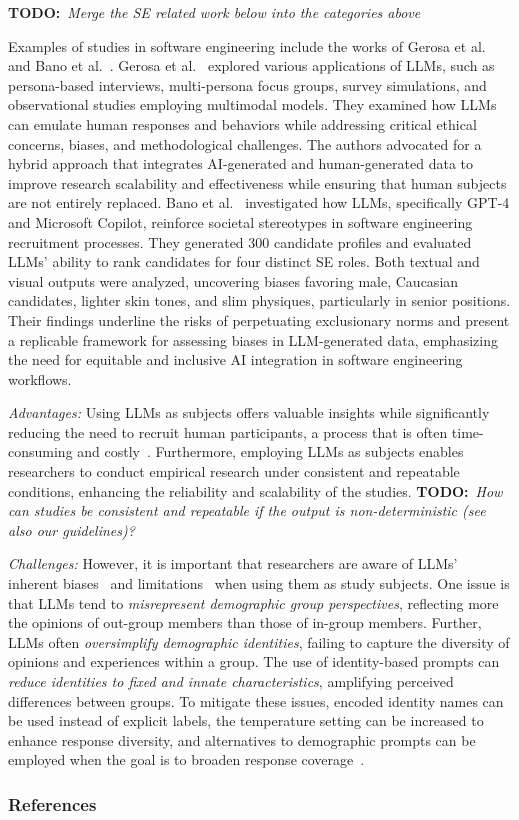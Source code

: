 \documentclass[11pt]{article}
\newcommand{\todo}[1]{{\textbf{TODO:}\ \textit{#1}}} %
\begin{document}
\todo{Merge the SE related work below into the categories above}

Examples of studies in software engineering include the works of Gerosa et al.~\cite{DBLP:journals/ase/GerosaTSS24} and Bano et al.~\cite{bano2025doessoftwareengineerlook}. 
Gerosa et al.~\cite{DBLP:journals/ase/GerosaTSS24} explored various applications of LLMs, such as persona-based interviews, multi-persona focus groups, survey simulations, and observational studies employing multimodal models. They examined how LLMs can emulate human responses and behaviors while addressing critical ethical concerns, biases, and methodological challenges. The authors advocated for a hybrid approach that integrates AI-generated and human-generated data to improve research scalability and effectiveness while ensuring that human subjects are not entirely replaced.
Bano et al.~\cite{bano2025doessoftwareengineerlook} investigated how LLMs, specifically GPT-4 and Microsoft Copilot, reinforce societal stereotypes in software engineering recruitment processes. They generated 300 candidate profiles and evaluated LLMs' ability to rank candidates for four distinct SE roles. Both textual and visual outputs were analyzed, uncovering biases favoring male, Caucasian candidates, lighter skin tones, and slim physiques, particularly in senior positions. Their findings underline the risks of perpetuating exclusionary norms and present a replicable framework for assessing biases in LLM-generated data, emphasizing the need for equitable and inclusive AI integration in software engineering workflows.

\emph{Advantages:} Using LLMs as subjects offers valuable insights while significantly reducing the need to recruit human participants, a process that is often time-consuming and costly~\cite{DBLP:conf/vl/Madampe0HO24}. 
Furthermore, employing LLMs as subjects enables researchers to conduct empirical research under consistent and repeatable conditions, enhancing the reliability and scalability of the studies.
\todo{How can studies be consistent and repeatable if the output is non-deterministic (see also our guidelines)?}

\emph{Challenges:} However, it is important that researchers are aware of LLMs' inherent biases~\cite{Crowell2023} and limitations~\cite{DBLP:journals/ais/HardingDLL24, DBLP:journals/corr/abs-2402-01908} when using them as study subjects.
One issue is that LLMs tend to \emph{misrepresent demographic group perspectives}, reflecting more the opinions of out-group members than those of in-group members.
Further, LLMs often \emph{oversimplify demographic identities}, failing to capture the diversity of opinions and experiences within a group.
The use of identity-based prompts can \emph{reduce identities to fixed and innate characteristics}, amplifying perceived differences between groups.
To mitigate these issues, encoded identity names can be used instead of explicit labels, the temperature setting can be increased to enhance response diversity, and alternatives to demographic prompts can be employed when the goal is to broaden response coverage~\cite{DBLP:journals/ais/HardingDLL24, DBLP:journals/corr/abs-2402-01908}.


\subsubsection{References}



\end{document}

